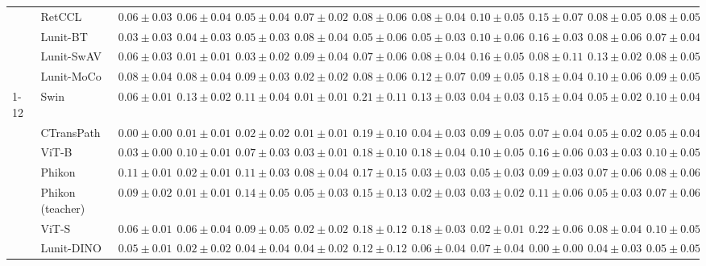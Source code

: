 \begin{tabular}{ll|cccc|c|cccc|c}
 & RetCCL & $0.06 \pm 0.03$ & $0.06 \pm 0.04$ & $0.05 \pm 0.04$ & $0.07 \pm 0.02$ & $0.08 \pm 0.06$ & $0.08 \pm 0.04$ & $0.10 \pm 0.05$ & $0.15 \pm 0.07$ & $0.08 \pm 0.05$ & $0.08 \pm 0.05$ \\
 & Lunit-BT & $0.03 \pm 0.03$ & $0.04 \pm 0.03$ & $0.05 \pm 0.03$ & $0.08 \pm 0.04$ & $0.05 \pm 0.06$ & $0.05 \pm 0.03$ & $0.10 \pm 0.06$ & $0.16 \pm 0.03$ & $0.08 \pm 0.06$ & $0.07 \pm 0.04$ \\
 & Lunit-SwAV & $0.06 \pm 0.03$ & $\mathbf{0.01 \pm 0.01}$ & $0.03 \pm 0.02$ & $0.09 \pm 0.04$ & $0.07 \pm 0.06$ & $0.08 \pm 0.04$ & $0.16 \pm 0.05$ & $0.08 \pm 0.11$ & $0.13 \pm 0.02$ & $0.08 \pm 0.05$ \\
 & Lunit-MoCo & $0.08 \pm 0.04$ & $0.08 \pm 0.04$ & $0.09 \pm 0.03$ & $\mathbf{0.02 \pm 0.02}$ & $0.08 \pm 0.06$ & $0.12 \pm 0.07$ & $0.09 \pm 0.05$ & $0.18 \pm 0.04$ & $0.10 \pm 0.06$ & $0.09 \pm 0.05$ \\
\cline{1-12}
\multirow[t]{12}{*}{Mean pool} & Swin & $0.06 \pm 0.01$ & $0.13 \pm 0.02$ & $0.11 \pm 0.04$ & $0.01 \pm 0.01$ & $0.21 \pm 0.11$ & $0.13 \pm 0.03$ & $0.04 \pm 0.03$ & $0.15 \pm 0.04$ & $0.05 \pm 0.02$ & $0.10 \pm 0.04$ \\
 & CTransPath & $\mathbf{0.00 \pm 0.00}$ & $0.01 \pm 0.01$ & $\mathbf{0.02 \pm 0.02}$ & $\mathbf{0.01 \pm 0.01}$ & $0.19 \pm 0.10$ & $0.04 \pm 0.03$ & $0.09 \pm 0.05$ & $0.07 \pm 0.04$ & $0.05 \pm 0.02$ & $0.05 \pm 0.04$ \\
 & ViT-B & $0.03 \pm 0.00$ & $0.10 \pm 0.01$ & $0.07 \pm 0.03$ & $0.03 \pm 0.01$ & $0.18 \pm 0.10$ & $0.18 \pm 0.04$ & $0.10 \pm 0.05$ & $0.16 \pm 0.06$ & $0.03 \pm 0.03$ & $0.10 \pm 0.05$ \\
 & Phikon & $0.11 \pm 0.01$ & $0.02 \pm 0.01$ & $0.11 \pm 0.03$ & $0.08 \pm 0.04$ & $0.17 \pm 0.15$ & $0.03 \pm 0.03$ & $0.05 \pm 0.03$ & $0.09 \pm 0.03$ & $0.07 \pm 0.06$ & $0.08 \pm 0.06$ \\
 & Phikon (teacher) & $0.09 \pm 0.02$ & $\mathbf{0.01 \pm 0.01}$ & $0.14 \pm 0.05$ & $0.05 \pm 0.03$ & $0.15 \pm 0.13$ & $\mathbf{0.02 \pm 0.03}$ & $0.03 \pm 0.02$ & $0.11 \pm 0.06$ & $0.05 \pm 0.03$ & $0.07 \pm 0.06$ \\
 & ViT-S & $0.06 \pm 0.01$ & $0.06 \pm 0.04$ & $0.09 \pm 0.05$ & $0.02 \pm 0.02$ & $0.18 \pm 0.12$ & $0.18 \pm 0.03$ & $\mathbf{0.02 \pm 0.01}$ & $0.22 \pm 0.06$ & $0.08 \pm 0.04$ & $0.10 \pm 0.05$ \\
 & Lunit-DINO & $0.05 \pm 0.01$ & $0.02 \pm 0.02$ & $0.04 \pm 0.04$ & $0.04 \pm 0.02$ & $\mathbf{0.12 \pm 0.12}$ & $0.06 \pm 0.04$ & $0.07 \pm 0.04$ & $\mathbf{0.00 \pm 0.00}$ & $0.04 \pm 0.03$ & $\mathbf{0.05 \pm 0.05}$ \\

\end{tabular}

